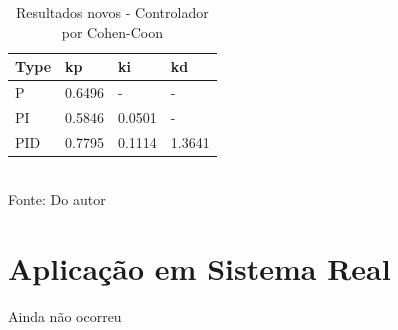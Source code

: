 \begin{table}[H]
    \caption{Resultados novos - Controlador por Cohen-Coon}
    \centering
    \begin{tabular}{|l|l|l|l|}
        \hline
        \textbf{Type} & \textbf{kp} & \textbf{ki} & \textbf{kd} \\
        \hline
        P             & 0.6496      & -           & -           \\
        \hline
        PI            & 0.5846      & 0.0501      & -           \\
        \hline
        PID           & 0.7795      & 0.1114      & 1.3641      \\
        \hline
    \end{tabular}
    \label{tab:comp_nw_cc}
    \\
    \vspace{0cm}\hspace{0cm}\small{Fonte: Do autor}
\end{table}


\section{Aplicação em Sistema Real}

Ainda não ocorreu
